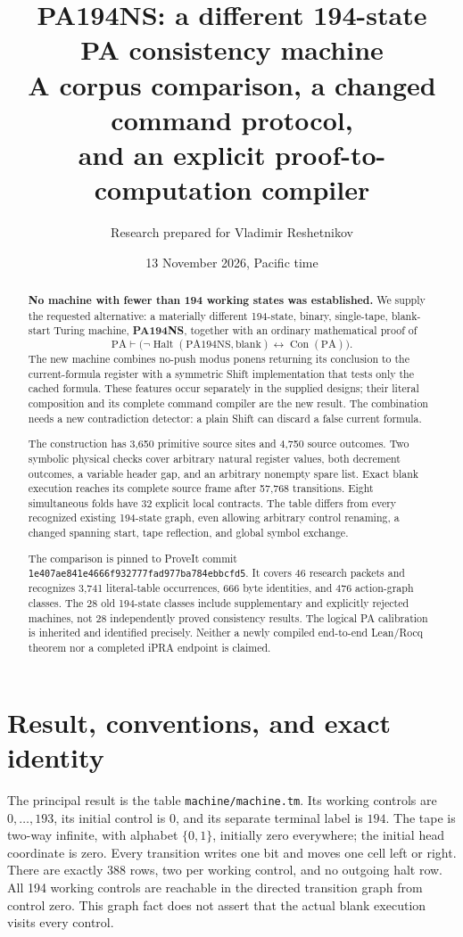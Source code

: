 \documentclass[11pt,letterpaper]{article}
\title{PA194NS: a different 194-state\\PA consistency machine\\[0.45em]
\large A corpus comparison, a changed command protocol,\\and an explicit proof-to-computation compiler}
\author{Research prepared for Vladimir Reshetnikov}
\date{13 November 2026, Pacific time}
\newcommand{\PA}{\mathrm{PA}}
\newcommand{\Con}{\operatorname{Con}}
\newcommand{\Halt}{\operatorname{Halt}}
\newcommand{\file}[1]{\texttt{\nolinkurl{#1}}}
\begin{document}
\maketitle
\begin{abstract}
\textbf{No machine with fewer than 194 working states was established.}
We supply the requested alternative: a materially different 194-state,
binary, single-tape, blank-start Turing machine, \textbf{PA194NS}, together
with an ordinary mathematical proof of
\[
 \PA\vdash\bigl(\neg\Halt(\mathrm{PA194NS},\mathrm{blank})
                         \leftrightarrow\Con(\PA)\bigr).
\]
The new machine combines no-push modus ponens returning its conclusion to
the current-formula register with a symmetric Shift implementation that
tests only the cached formula. These features occur separately in the
supplied designs; their literal composition and its complete command
compiler are the new result. The combination needs a new contradiction
detector: a plain Shift can discard a false current formula.

The construction has 3,650 primitive source sites and 4,750 source outcomes.
Two symbolic physical checks cover arbitrary natural register values,
both decrement outcomes, a variable header gap, and an arbitrary nonempty
spare list. Exact blank execution reaches its complete source frame after
57,768 transitions. Eight simultaneous folds have 32 explicit local
contracts. The table differs from every recognized existing 194-state
graph, even allowing arbitrary control renaming, a changed spanning start,
tape reflection, and global symbol exchange.

The comparison is pinned to ProveIt commit
\nolinkurl{1e407ae841e4666f932777fad977ba784ebbcfd5}.
It covers 46 research packets and recognizes 3,741 literal-table
occurrences, 666 byte identities, and 476 action-graph classes.
The 28 old 194-state classes include supplementary and explicitly rejected
machines, not 28 independently proved consistency results.
The logical PA calibration is inherited and identified precisely.
Neither a newly compiled end-to-end Lean/Rocq theorem nor a completed
iPRA endpoint is claimed.
\end{abstract}
\clearpage\tableofcontents\clearpage

\section{Result, conventions, and exact identity}
\label{sec:result}

The principal result is the table \file{machine/machine.tm}.
Its working controls are $0,\ldots,193$, its initial control is $0$, and
its separate terminal label is $194$. The tape is two-way infinite, with
alphabet $\{0,1\}$, initially zero everywhere; the initial head coordinate
is zero. Every transition writes one bit and moves one cell left or right.
There are exactly 388 rows, two per working control, and no outgoing halt
row. All 194 working controls are reachable in the directed transition
graph from control zero. This graph fact does not assert that the actual
blank execution visits every control.
\end{document}
